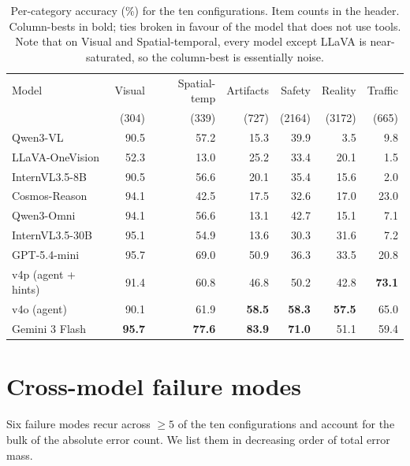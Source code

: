 \documentclass[11pt,a4paper]{article}
\begin{document}
\begin{table}[h]
\centering
\small
\begin{tabular}{lrrrrrr}
\toprule
Model & Visual & Spatial-temp & Artifacts & Safety & Reality & Traffic \\
& {(304)} & {(339)} & {(727)} & {(2164)} & {(3172)} & {(665)} \\
\midrule
Qwen3-VL                & 90.5 & 57.2 & 15.3 & 39.9 &  3.5 &  9.8 \\
LLaVA-OneVision         & 52.3 & 13.0 & 25.2 & 33.4 & 20.1 &  1.5 \\
InternVL3.5-8B          & 90.5 & 56.6 & 20.1 & 35.4 & 15.6 &  2.0 \\
Cosmos-Reason           & 94.1 & 42.5 & 17.5 & 32.6 & 17.0 & 23.0 \\
Qwen3-Omni            & 94.1 & 56.6 & 13.1 & 42.7 & 15.1 &  7.1 \\
InternVL3.5-30B         & 95.1 & 54.9 & 13.6 & 30.3 & 31.6 &  7.2 \\
GPT-5.4-mini            & 95.7 & 69.0 & 50.9 & 36.3 & 33.5 & 20.8 \\
v4p (agent + hints)     & 91.4 & 60.8 & 46.8 & 50.2 & 42.8 & \textbf{73.1} \\
v4o (agent)             & 90.1 & 61.9 & \textbf{58.5} & \textbf{58.3} & \textbf{57.5} & 65.0 \\
Gemini 3 Flash          & \textbf{95.7} & \textbf{77.6} & \textbf{83.9} & \textbf{71.0} & 51.1 & 59.4 \\
\bottomrule
\end{tabular}
\caption{Per-category accuracy (\%) for the ten configurations. Item
counts in the header. Column-bests in bold; ties broken in favour of
the model that does not use tools. Note that on Visual and
Spatial-temporal, every model except LLaVA is near-saturated, so the
column-best is essentially noise.}
\label{tab:cat}
\end{table}

\section{Cross-model failure modes}
\label{sec:modes}

Six failure modes recur across $\geq 5$ of the ten configurations and
account for the bulk of the absolute error count. We list them in
decreasing order of total error mass.
\end{document}
